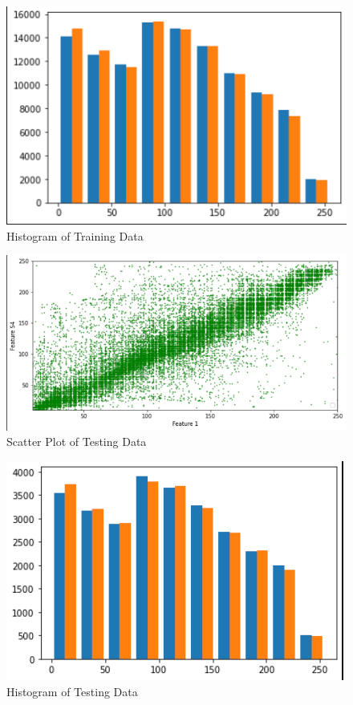 \documentclass[conference]{IEEEtran}
\begin{document}
\begin{figure}[h]
  \centering
  \includegraphics[width=\linewidth]{trainingHis.png}
  \caption{Histogram of Training Data}
\end{figure}

\begin{figure}[h]
  \centering
  \includegraphics[width=\linewidth]{testsp.png}
  \caption{Scatter Plot of Testing Data}
\end{figure}

\begin{figure}[h]
  \centering
  \includegraphics[width=\linewidth]{testingHis.png}
  \caption{Histogram of Testing Data}
\end{figure}
\end{document}
